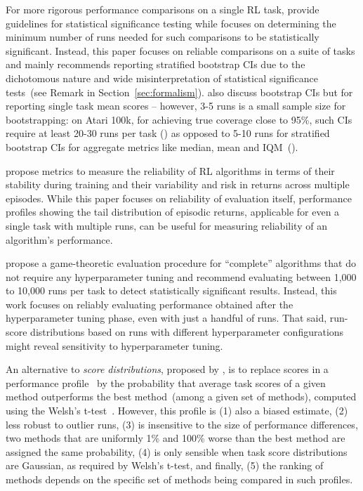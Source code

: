 For more rigorous performance comparisons on a single RL task, \citet{henderson2018deep, colas2019hitchhiker} provide guidelines for statistical significance testing while \citet{colas2018many} focuses on determining the minimum number of runs needed for such comparisons to be statistically significant. Instead, this paper focuses on reliable comparisons on a suite of tasks and mainly recommends reporting stratified bootstrap CIs due to the dichotomous nature and wide misinterpretation of statistical significance tests~(see Remark in Section~\ref{sec:formalism}). \citet{henderson2018deep, colas2018many, colas2019hitchhiker} also discuss bootstrap CIs but for reporting single task mean scores – however, 3-5 runs is a small sample size for bootstrapping: on Atari 100k, for achieving true coverage close to 95\%, such CIs require at least 20-30 runs per task () as opposed to 5-10 runs for stratified bootstrap CIs for aggregate metrics like median, mean and IQM~().



\citet{chan2019measuring} propose metrics to measure the reliability of RL algorithms in terms of their stability during training and their variability and risk in returns across multiple episodes. While this paper focuses on reliability of evaluation itself, performance profiles showing the tail distribution of episodic returns, applicable for even a single task with multiple runs, can be useful for measuring reliability of an algorithm’s performance.  

\citet{jordan2020evaluating} propose a game-theoretic evaluation procedure for ``complete'' algorithms that do not require any hyperparameter tuning and recommend evaluating between 1,000 to 10,000 runs per task to detect statistically significant results. Instead, this work focuses on reliably evaluating performance obtained after the hyperparameter tuning phase, even with just a handful of runs. That said, run-score distributions based on runs with different hyperparameter configurations might reveal sensitivity to hyperparameter tuning.

An alternative to \emph{score distributions}, proposed by \citet{recht-2018}, is to replace scores in a performance profile~\citep{dolan2002benchmarking} by the probability that average task scores of a given method outperforms the best method~(among a given set of methods), computed using the Welsh's t-test~\citep{welch1947generalization}. However, this profile is (1) also a biased estimate, (2) less robust to outlier runs, (3) is insensitive to the size of performance differences, \ie two methods that are uniformly 1\% and 100\% worse than the best method are assigned the same probability, (4) is only sensible when task score distributions are Gaussian, as required by Welsh's t-test, and finally, (5) the ranking of methods depends on the specific set of methods being compared in such profiles. 


